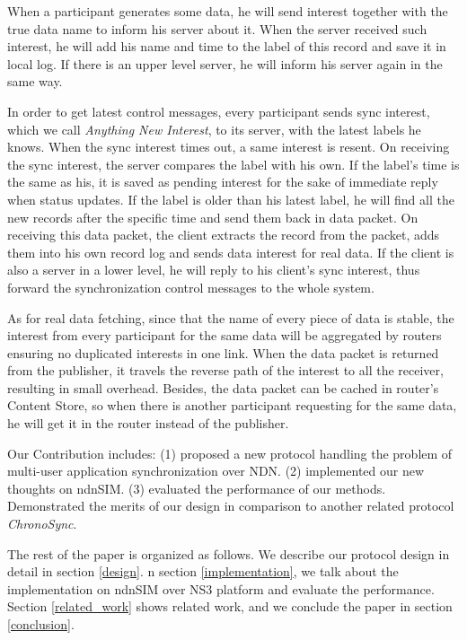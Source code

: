 \documentclass[conference]{IEEEtran}
\begin{document}
When a participant generates some data,
he will send interest together with the true data name to inform his server about it.
When the server received such interest,
he will add his name and time to the label of this record and save it in local log.
If there is an upper level server, he will inform his server again in the same way.

In order to get latest control messages,
every participant sends sync interest, which we call \emph{Anything New Interest},
to its server, with the latest labels he knows. When the sync interest times out,
a same interest is resent. On receiving the sync interest,
the server compares the label with his own.
If the label's time is the same as his,
it is saved as pending interest for the sake of immediate reply when status updates.
If the label is older than his latest label,
he will find all the new records after the specific time and send them back in data packet.
On receiving this data packet, the client extracts the record from the packet,
adds them into his own record log and sends data interest for real data.
If the client is also a server in a lower level,
he will reply to his client's sync interest,
thus forward the synchronization control messages to the whole system.

As for real data fetching, since that the name of every piece of data is stable,
the interest from every participant for the same data
will be aggregated by routers ensuring no duplicated interests in one link.
When the data packet is returned from the publisher,
it travels the reverse path of the interest to all the receiver,
resulting in small overhead. Besides, the data packet can be cached in router's Content Store,
so when there is another participant requesting for the same data,
he will get it in the router instead of the publisher.

Our Contribution includes:
(1) proposed a new protocol handling the problem of multi-user application synchronization over NDN.
(2) implemented our new thoughts on ndnSIM\cite{ndnSIM}.
(3) evaluated the performance of our methods.
Demonstrated the merits of our design in comparison to another related protocol \emph{ChronoSync\cite{ChronoSync}}.

The rest of the paper is organized as follows.
We describe our protocol design in detail in section \ref{design}.
n section \ref{implementation},
we talk about the implementation on ndnSIM over NS3 platform and evaluate the performance.
Section \ref{related_work} shows related work,
and we conclude the paper in section \ref{conclusion}.
\end{document}
